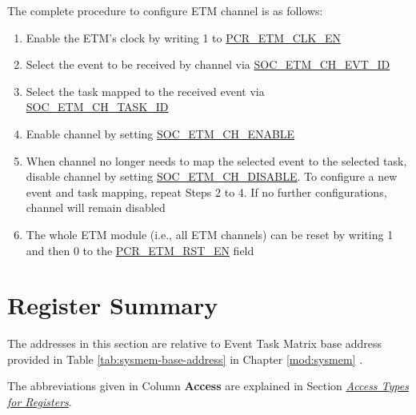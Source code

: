\documentclass[main\_\_EN.tex]{subfiles}
\begin{document}
The complete procedure to configure ETM channel is as follows:
\begin{enumerate}
    \item Enable the ETM's clock by writing 1 to \hyperref[fielddesc:PCRETMCLKEN]{PCR\_ETM\_CLK\_EN}
    \item Select the event to be received by channel via \hyperref[fielddesc:SOCETMCH0EVTID]{SOC\_ETM\_CH\_EVT\_ID}
    \item Select the task mapped to the received event via  \hyperref[fielddesc:SOCETMCH0TASKID]{SOC\_ETM\_CH\_TASK\_ID}
    \item Enable channel by setting  \hyperref[fielddesc:SOCETMCHENABLE0]{SOC\_ETM\_CH\_ENABLE}
    \item When channel no longer needs to map the selected event to the selected task, disable channel by setting \hyperref[fielddesc:SOCETMCHDISABLE0]{SOC\_ETM\_CH\_DISABLE}. To configure a new event and task mapping, repeat Steps 2 to 4. If no further configurations, channel will remain disabled
    \item The whole ETM module (i.e., all ETM channels) can be reset by writing 1 and then 0 to the \hyperref[fielddesc:PCRETMRSTEN]{PCR\_ETM\_RST\_EN} field
\end{enumerate}






\newpage
\hypertarget{evntaskmatrix-reg-summ}{}
\section{Register Summary}
\label{sec:evntaskmatrix-reg-summ}

The addresses in this section are relative to Event Task Matrix base address provided in Table \ref{tab:sysmem-base-address} in Chapter \ref{mod:sysmem} \textit{}.

The abbreviations given in Column \textbf{Access} are explained in Section \hyperref[glossary-access-types]{\textit{Access Types for Registers}}.
\end{document}
